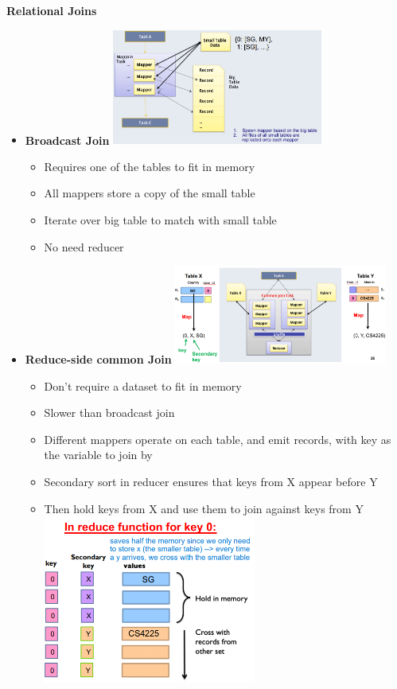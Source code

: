 \documentclass[10pt, landscape]{article}
\begin{document}
\begin{multicols}{4}
\textbf{Relational Joins}
\begin{itemize}
  \item \textbf{Broadcast Join}
  \includegraphics*[width=7cm]{bcast_join.png}
  \begin{itemize}
    \item Requires one of the tables to fit in memory 
    \item All mappers store a copy of the small table 
    \item Iterate over big table to match with small table 
    \item No need reducer
  \end{itemize}
  \item \textbf{Reduce-side common Join}
  \includegraphics*[width=7cm]{common_join.png}
  \begin{itemize}
    \item Don't require a dataset to fit in memory 
    \item Slower than broadcast join
    \item Different mappers operate on each table, and emit records, with key as the variable to join by 
    \item Secondary sort in reducer ensures that keys from X appear before Y
    \item Then hold keys from X and use them to join against keys from Y
    \includegraphics*[width=7cm]{common_reduce.png}
  \end{itemize}
\end{itemize}


\end{multicols}
\end{document}
